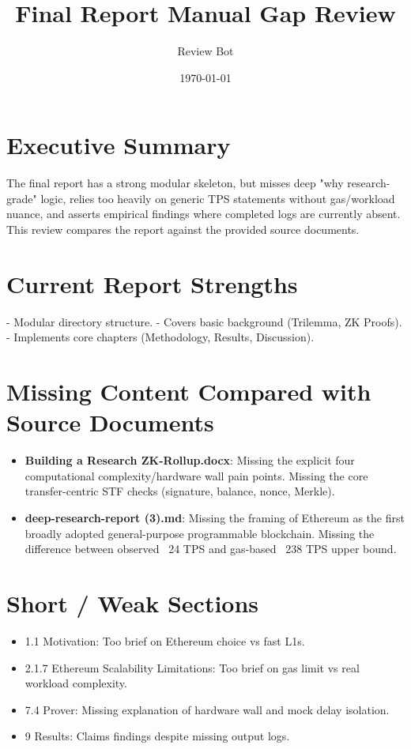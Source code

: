 \documentclass[12pt]{article}
\title{Final Report Manual Gap Review}
\author{Review Bot}
\date{\today}
\begin{document}
\maketitle

\section{Executive Summary}
The final report has a strong modular skeleton, but misses deep "why research-grade" logic, relies too heavily on generic TPS statements without gas/workload nuance, and asserts empirical findings where completed logs are currently absent. This review compares the report against the provided source documents.

\section{Current Report Strengths}
- Modular directory structure.
- Covers basic background (Trilemma, ZK Proofs).
- Implements core chapters (Methodology, Results, Discussion).

\section{Missing Content Compared with Source Documents}
\begin{itemize}
    \item \textbf{Building a Research ZK-Rollup.docx}: Missing the explicit four computational complexity/hardware wall pain points. Missing the core transfer-centric STF checks (signature, balance, nonce, Merkle).
    \item \textbf{deep-research-report (3).md}: Missing the framing of Ethereum as the first broadly adopted general-purpose programmable blockchain. Missing the difference between observed ~24 TPS and gas-based ~238 TPS upper bound.
\end{itemize}

\section{Short / Weak Sections}
\begin{itemize}
    \item 1.1 Motivation: Too brief on Ethereum choice vs fast L1s.
    \item 2.1.7 Ethereum Scalability Limitations: Too brief on gas limit vs real workload complexity.
    \item 7.4 Prover: Missing explanation of hardware wall and mock delay isolation.
    \item 9 Results: Claims findings despite missing output logs.
\end{itemize}
\end{document}
